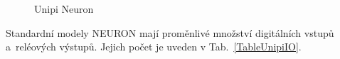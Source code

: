 \begin{figure}[!ht]
    \centering
			\hspace*{5mm}
			\hspace*{5mm}
			\caption{Unipi Neuron~\cite{UniPiBoard2}}
			\label{UnipiNeuronModels}
\end{figure}

\newpage{}
Standardní modely NEURON mají proměnlivé množství digitálních vstupů a~reléových výstupů. Jejich počet je uveden v Tab.~\ref{TableUnipiIO}.

